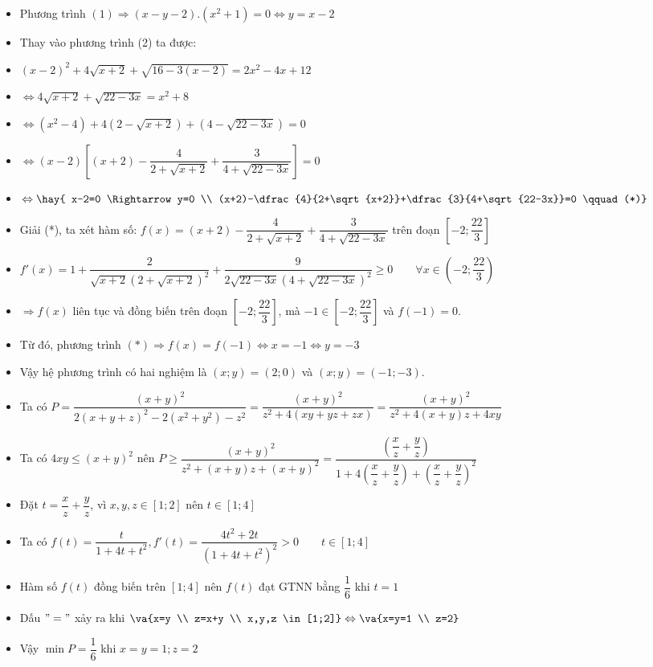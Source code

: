 \begin{itemize}[label=,leftmargin=*]
\item Phương trình $ (1) \Rightarrow 	(x-y-2).(x^2+1)=0 \Leftrightarrow y=x-2 $
\item Thay vào phương trình (2) ta được:
\item $(x-2)^2+4\sqrt{x+2}+\sqrt{16-3(x-2)}=2x^2-4x+12$
\item $\Leftrightarrow 4\sqrt{x+2}+ \sqrt{22-3x}=x^2+8$
\item $\Leftrightarrow (x^2-4) +4(2-\sqrt{x+2})	+(4-\sqrt{22-3x})=0$
\item $\Leftrightarrow (x-2) \left[(x+2)-\dfrac{4}{2+\sqrt{x+2}}+\dfrac{3}{4+\sqrt{22-3x}} \right]=0$
\item $\Leftrightarrow \hay{ x-2=0 \Rightarrow y=0 \\ 
(x+2)-\dfrac{4}{2+\sqrt{x+2}}+\dfrac{3}{4+\sqrt{22-3x}}=0 \qquad (*)}$
\item Giải (*), ta xét hàm số: $f(x)=(x+2)-\dfrac{4}{2+\sqrt{x+2}}+\dfrac{3}{4+\sqrt{22-3x}}$ trên đoạn $\left[-2;\dfrac{22}{3}\right]$
\item $f'(x)=1+\dfrac{2}{\sqrt{x+2}(2+\sqrt{x+2})^2}+\dfrac{9}{2\sqrt{22-3x}(4+\sqrt{22-3x})^2} \ge 0 \qquad \forall x \in \left( -2;\dfrac{22}{3}\right)$
\item $\Rightarrow f(x)$ liên tục và đồng biến trên đoạn $\left[-2;\dfrac{22}{3} \right]$, mà $-1 \in \left[-2;\dfrac{22}{3} \right]$ và $f(-1)=0$.
\item 	 Từ đó, phương trình $(*) \Rightarrow f(x)=f(-1) \Leftrightarrow  x=-1 \Leftrightarrow y=-3$
\item Vậy hệ phương trình có hai nghiệm là $(x;y)=(2;0)$ và $(x;y)=(-1;-3).$
\end{itemize}

\lgi 
\begin{itemize}[label=,leftmargin=*]
\item Ta có $P=\dfrac{(x+y)^2}{2(x+y+z)^2-2(x^2+y^2)-z^2}=\dfrac{(x+y)^2}{z^2+4(xy+yz+zx)}=\dfrac{(x+y)^2}{z^2+4(x+y)z+4xy}$
\item  Ta có $4xy\le (x+y)^2$ nên
 $P\ge \dfrac{(x+y)^2}{z^2+(x+y)z+(x+y)^2}=\dfrac{\left(\dfrac{x}{z}+\dfrac{y}{z}\right)}{1+4\left(\dfrac{x}{z}+\dfrac{y}{z}\right)+\left(\dfrac{x}{z}+\dfrac{y}{z}\right)^2}$
 \item Đặt $t=\dfrac{x}{z}+\dfrac{y}{z}$, vì $x,y,z \in [1;2]$ nên $t \in [1;4]$
 \item Ta có $f(t) = \dfrac{t}{1+4t+t^2},f'(t)=\dfrac{4t^2+2t}{(1+4t+t^2)^2} >0 \qquad t\in [1;4]$ \item Hàm số $f(t)$ đồng biến trên $[1;4]$	nên $f(t)$ đạt GTNN  bằng $\dfrac{1}{6}$  khi $t=1$	
 \item Dấu $"="$ xảy ra khi $ \va {x=y \\ z=x+y \\
 x,y,z \in [1;2]}\Leftrightarrow  \va{x=y=1 \\ z=2}$
 \item Vậy $\min P=\dfrac{1}{6} $ khi $x=y=1; z=2$
 \end{itemize}
